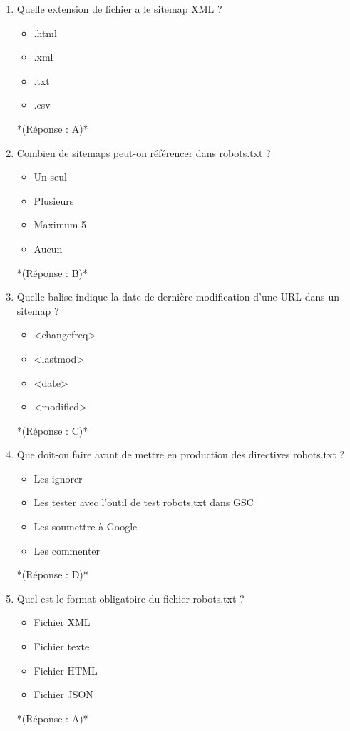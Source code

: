 \documentclass[12pt,a4paper,twoside]{report}
\begin{document}
\begin{enumerate}
\item Quelle extension de fichier a le sitemap XML ?
\begin{itemize}
\item[A)] .html
\item[B)] .xml
\item[C)] .txt
\item[D)] .csv
\end{itemize}
*(Réponse : A)*

\item Combien de sitemaps peut-on référencer dans robots.txt ?
\begin{itemize}
\item[A)] Un seul
\item[B)] Plusieurs
\item[C)] Maximum 5
\item[D)] Aucun
\end{itemize}
*(Réponse : B)*

\item Quelle balise indique la date de dernière modification d'une URL dans un sitemap ?
\begin{itemize}
\item[A)] <changefreq>
\item[B)] <lastmod>
\item[C)] <date>
\item[D)] <modified>
\end{itemize}
*(Réponse : C)*

\item Que doit-on faire avant de mettre en production des directives robots.txt ?
\begin{itemize}
\item[A)] Les ignorer
\item[B)] Les tester avec l'outil de test robots.txt dans GSC
\item[C)] Les soumettre à Google
\item[D)] Les commenter
\end{itemize}
*(Réponse : D)*

\item Quel est le format obligatoire du fichier robots.txt ?
\begin{itemize}
\item[A)] Fichier XML
\item[B)] Fichier texte
\item[C)] Fichier HTML
\item[D)] Fichier JSON
\end{itemize}
*(Réponse : A)*


\end{enumerate}
\end{document}
